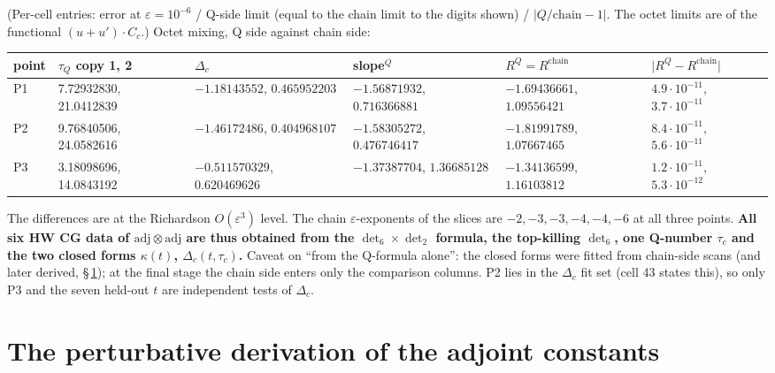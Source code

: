 \documentclass[10pt]{article}
\begin{document}
(Per-cell entries: error at $\varepsilon=10^{-6}$ / Q-side limit (equal to the chain limit to the digits shown) / $|Q/\mathrm{chain}-1|$. The octet limits are of the functional $(u+u')\cdot C_c$.) Octet mixing, Q side against chain side:

\begin{center}\footnotesize\setlength{\tabcolsep}{3pt}\begin{longtable}{@{}p{0.9cm}p{2.7cm}p{2.9cm}p{2.9cm}p{2.9cm}p{2.5cm}@{}}\toprule
\textbf{point} & \textbf{$\tau_Q$ copy 1, 2} & \textbf{$\Delta_c$} & \textbf{slope$^Q$} & \textbf{$R^Q=R^{\mathrm{chain}}$} & \textbf{$\lvert R^Q-R^{\mathrm{chain}}\rvert$} \\\midrule\endhead
P1 & 7.72932830, 21.0412839 & $-1.18143552$, $0.465952203$ & $-1.56871932$, $0.716366881$ & $-1.69436661$, $1.09556421$ & $4.9\cdot10^{-11}$, $3.7\cdot10^{-11}$ \\
P2 & 9.76840506, 24.0582616 & $-1.46172486$, $0.404968107$ & $-1.58305272$, $0.476746417$ & $-1.81991789$, $1.07667465$ & $8.4\cdot10^{-11}$, $5.6\cdot10^{-11}$ \\
P3 & 3.18098696, 14.0843192 & $-0.511570329$, $0.620469626$ & $-1.37387704$, $1.36685128$ & $-1.34136599$, $1.16103812$ & $1.2\cdot10^{-11}$, $5.3\cdot10^{-12}$ \\
\bottomrule\end{longtable}\end{center}

The differences are at the Richardson $O(\varepsilon^3)$ level. The chain $\varepsilon$-exponents of the slices are $-2,-3,-3,-4,-4,-6$ at all three points. \textbf{All six HW CG data of $\mathrm{adj}\otimes\mathrm{adj}$ are thus obtained from the $\det_6\times\det_2$ formula, the top-killing $\det_6$, one Q-number $\tau_c$ and the two closed forms $\kappa(t)$, $\Delta_c(t,\tau_c)$.} Caveat on ``from the Q-formula alone'': the closed forms were fitted from chain-side scans (and later derived, \S\,\ref{sec:pert}); at the final stage the chain side enters only the comparison columns. P2 lies in the $\Delta_c$ fit set (cell 43 states this), so only P3 and the seven held-out $t$ are independent tests of $\Delta_c$.

\section{The perturbative derivation of the adjoint constants}\label{sec:pert}
\end{document}
